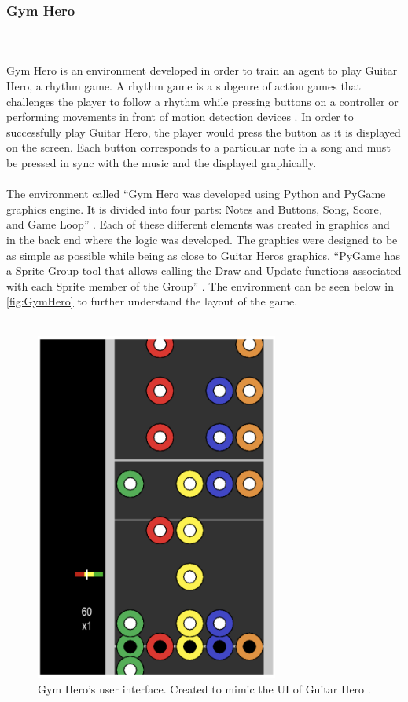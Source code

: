 \documentclass[a4paper,12pt]{article}
\begin{document}
\subsubsection{Gym Hero}
\\\\
Gym Hero is an environment developed in order to train an agent to play Guitar Hero, a rhythm game. A rhythm game is a subgenre of action games that challenges the player to follow a rhythm \cite{Adams} while pressing buttons on a controller or performing movements in front of motion detection devices \cite{GymHero}. In order to successfully play Guitar Hero, the player would press the button as it is displayed on the screen. Each button corresponds to a particular note in a song and must be pressed in sync with the music and the displayed graphically. 
\\\\
The environment called ``Gym Hero was developed using Python and PyGame graphics engine. It is divided into four parts: Notes and Buttons, Song, Score, and Game Loop'' \cite{GymHero}. Each of these different elements was created in graphics and in the back end where the logic was developed. The graphics were designed to be as simple as possible while being as close to Guitar Heros graphics. ``PyGame has a Sprite Group tool that allows calling the Draw and Update functions associated with each Sprite member of the Group'' \cite{GymHero}. The environment can be seen below in \autoref{fig:GymHero} to further understand the layout of the game. 
\\\\
\begin{figure}[H]
\centering
\includegraphics[width=8cm]{imgs/GymHero.png}
\caption{Gym Hero's user interface. Created to mimic the UI of Guitar Hero \cite{GymHero}.}
\label{fig:GymHero}
\end{figure}
\end{document}
